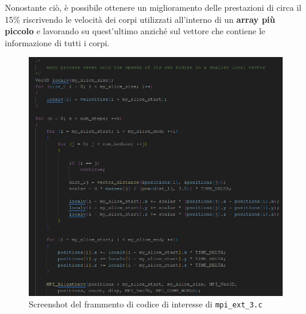 \documentclass[12pt]{report}
\begin{document}
    \newpage
    
    Nonostante ciò, è possibile ottenere un miglioramento delle prestazioni di circa il 15\% riscrivendo le velocità dei corpi utilizzati all'interno di un \textbf{array più piccolo} e lavorando su quest'ultimo anziché sul vettore che contiene le informazione di tutti i corpi. 

    \begin{figure}[H]
        \centering
        \includegraphics[width=\textwidth]{images/mpi_ext_3.png}
        \caption{Screenshot del frammento di codice di interesse di \texttt{mpi\_ext\_3.c}}
        \label{fig:mpi_ext_3}
    \end{figure}
\end{document}
